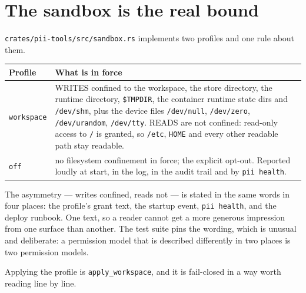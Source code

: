 \section{The sandbox is the real bound}

\texttt{crates/pii-tools/src/sandbox.rs} implements two profiles and one rule about them.

\begin{longtable}{@{}p{}p{}@{}}
\toprule
\textbf{Profile} & \textbf{What is in force} \\
\midrule
\endhead
\texttt{workspace} & WRITES confined to the workspace, the store directory, the runtime directory,
\texttt{\$TMPDIR}, the container runtime state dirs and \texttt{/dev/shm}, plus the device
files \texttt{/dev/null}, \texttt{/dev/zero}, \texttt{/dev/urandom}, \texttt{/dev/tty}. READS
are not confined: read-only access to \texttt{/} is granted, so \texttt{/etc}, \texttt{HOME}
and every other
readable path stay readable. \\
\texttt{off} & no filesystem confinement in force; the explicit opt-out. Reported loudly at start,
in the log, in the audit trail and by \texttt{pii health}. \\
\bottomrule
\end{longtable}

The asymmetry --- writes confined, reads not --- is stated in the same words in four places:
the profile's grant text, the startup event, \texttt{pii health}, and the deploy runbook. One
text, so a reader cannot get a more generous impression from one surface than another. The
test suite pins the wording, which is unusual and deliberate: a permission model that is
described differently in two places is two permission models.

Applying the profile is \texttt{apply\_workspace}, and it is fail-closed in a way worth
reading line by line.

